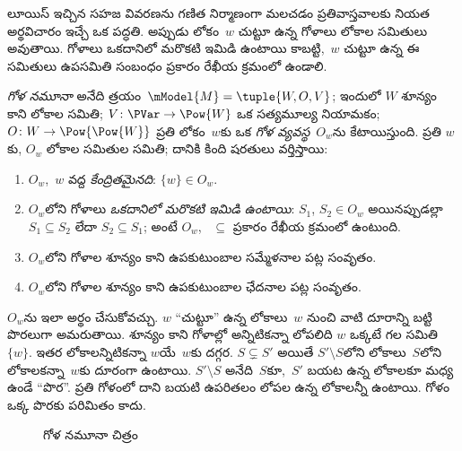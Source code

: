 \documentclass[../../../include/open-logic-section]{subfiles}
\begin{document}


లూయిస్ ఇచ్చిన సహజ వివరణను గణిత నిర్మాణంగా మలచడం
ప్రతివాస్తవాలకు నియత అర్థవిచారం ఇచ్చే ఒక పద్ధతి. అప్పుడు
లోకం~$w$ చుట్టూ ఉన్న గోళాలు లోకాల సమితులు అవుతాయి.
గోళాలు ఒకదానిలో మరొకటి ఇమిడి ఉంటాయి కాబట్టి,~$w$ చుట్టూ
ఉన్న ఈ సమితులు ఉపసమితి సంబంధం ప్రకారం రేఖీయ క్రమంలో ఉండాలి.

\begin{defn}
  \emph{గోళ నమూనా} అనేది
  త్రయం~$\mModel{M} = \tuple{W, O, V}$;
ఇందులో $W$ శూన్యం కాని లోకాల
  సమితి; $V\colon \PVar \to \Pow{W}$
  ఒక సత్యమూల్య నియామకం; $O\colon W
  \to \Pow{\Pow{W}}$ ప్రతి లోకం~$w$కు
  ఒక \emph{గోళ వ్యవస్థ}~$O_w$ను
  కేటాయిస్తుంది. ప్రతి $w$కు,
  $O_w$ లోకాల సమితుల సమితి;
దానికి కింది షరతులు వర్తిస్తాయి:
  \begin{enumerate}
  \item $O_w$,~$w$ వద్ద
    \emph{కేంద్రితమైనది}: $\{w\} \in O_w$.
  \item $O_w$లోని గోళాలు \emph{ఒకదానిలో మరొకటి ఇమిడి ఉంటాయి}:
    $S_1$, $S_2 \in O_w$
    అయినప్పుడల్లా $S_1
    \subseteq S_2$ లేదా $S_2
    \subseteq S_1$; అంటే $O_w$,
    ~$\subseteq$ ప్రకారం రేఖీయ
    క్రమంలో ఉంటుంది.
  \item $O_w$లోని గోళాల
    శూన్యం కాని ఉపకుటుంబాల
    సమ్మేళనాల పట్ల సంవృతం.
  \item $O_w$లోని గోళాల
    శూన్యం కాని ఉపకుటుంబాల
    ఛేదనాల పట్ల సంవృతం.
  \end{enumerate}
\end{defn}

$O_w$ను ఇలా అర్థం చేసుకోవచ్చు. $w$
``చుట్టూ'' ఉన్న లోకాలు~$w$ నుంచి
వాటి దూరాన్ని బట్టి పొరలుగా అమరుతాయి. శూన్యం కాని గోళాల్లో అన్నిటికన్నా లోపలిది $w$ ఒక్కటే గల
సమితి~$\{w\}$. ఇతర లోకాలన్నిటికన్నా $w$యే~$w$కు దగ్గర. $S \subsetneq S'$
అయితే $S' \setminus S$లోని
లోకాలు~$S$లోని లోకాలకన్నా~$w$కు
దూరంగా ఉంటాయి. $S' \setminus S$
అనేది~$S$కూ,~$S'$ బయట ఉన్న
లోకాలకూ మధ్య ఉండే ``పొర''.
ప్రతి గోళంలో దాని బయటి ఉపరితలం లోపల ఉన్న
లోకాలన్నీ ఉంటాయి. గోళం ఒక్క పొరకు పరిమితం కాదు.

\begin{figure}
\begin{center}
\caption{గోళ నమూనా చిత్రం}
\end{center}
\end{figure}
\end{document}
